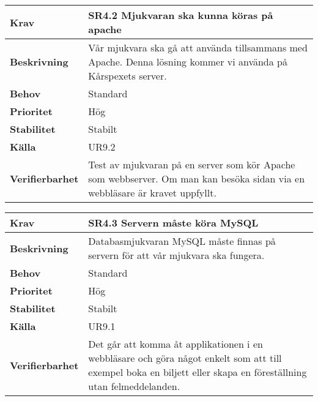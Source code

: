 \documentclass[a4paper, twoside, 11pt, titlepage]{article}
\begin{document}
	\begin {table} [ht] \begin{tabular} { p{2.6cm} p{12.5cm} }
		\hline
		\sffamily\textbf{Krav} & \sffamily\textbf{SR4.2 Mjukvaran ska kunna köras på apache } \\
		\hline
		\sffamily\textbf{Beskrivning} & Vår mjukvara ska gå att använda tillsammans med Apache. Denna lösning kommer vi använda på Kårspexets server.  \\
		\hline
		\sffamily\textbf{Behov} & Standard  \\
		\hline
		\sffamily\textbf{Prioritet} & Hög  \\
		\hline
		\sffamily\textbf{Stabilitet} & Stabilt  \\
		\hline
		\sffamily\textbf{Källa} & UR9.2  \\
		\hline
		\sffamily\textbf{Verifierbarhet} & Test av mjukvaran på en server som kör Apache som webbserver. Om man kan besöka sidan via en webbläsare är kravet uppfyllt.  \\
		\hline
	\end{tabular} \end{table} \FloatBarrier
	\vspace{6mm}

	\begin {table} [ht] \begin{tabular} { p{2.6cm} p{12.5cm} }
		\hline
		\sffamily\textbf{Krav} & \sffamily\textbf{SR4.3 Servern måste köra MySQL } \\
		\hline
		\sffamily\textbf{Beskrivning} & Databasmjukvaran MySQL måste finnas på servern för att vår mjukvara ska fungera.  \\
		\hline
		\sffamily\textbf{Behov} & Standard  \\
		\hline
		\sffamily\textbf{Prioritet} & Hög  \\
		\hline
		\sffamily\textbf{Stabilitet} & Stabilt  \\
		\hline
		\sffamily\textbf{Källa} & UR9.1  \\
		\hline
		\sffamily\textbf{Verifierbarhet} & Det går att komma åt applikationen i en webbläsare och göra något enkelt som att till exempel boka en biljett eller skapa en föreställning utan felmeddelanden.  \\
		\hline
	\end{tabular} \end{table} \FloatBarrier
	\vspace{6mm}
\end{document}
